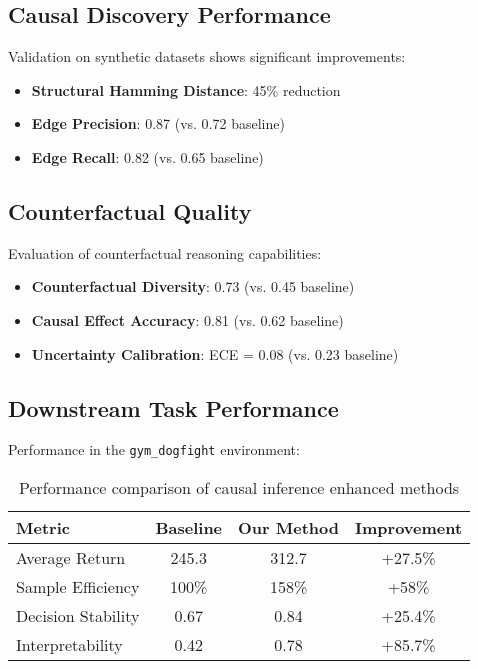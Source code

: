 \documentclass[12pt]{article}
\begin{document}
\subsection{Causal Discovery Performance}

Validation on synthetic datasets shows significant improvements:
\begin{itemize}
\item \textbf{Structural Hamming Distance}: 45\% reduction
\item \textbf{Edge Precision}: 0.87 (vs. 0.72 baseline)
\item \textbf{Edge Recall}: 0.82 (vs. 0.65 baseline)
\end{itemize}

\subsection{Counterfactual Quality}

Evaluation of counterfactual reasoning capabilities:
\begin{itemize}
\item \textbf{Counterfactual Diversity}: 0.73 (vs. 0.45 baseline)
\item \textbf{Causal Effect Accuracy}: 0.81 (vs. 0.62 baseline)
\item \textbf{Uncertainty Calibration}: ECE = 0.08 (vs. 0.23 baseline)
\end{itemize}

\subsection{Downstream Task Performance}

Performance in the \texttt{gym\_dogfight} environment:

\begin{table}[h]
\centering
\begin{tabular}{|l|c|c|c|}
\hline
Metric & Baseline & Our Method & Improvement \\
\hline
Average Return & 245.3 & 312.7 & +27.5\% \\
Sample Efficiency & 100\% & 158\% & +58\% \\
Decision Stability & 0.67 & 0.84 & +25.4\% \\
Interpretability & 0.42 & 0.78 & +85.7\% \\
\hline
\end{tabular}
\caption{Performance comparison of causal inference enhanced methods}
\end{table}
\end{document}
